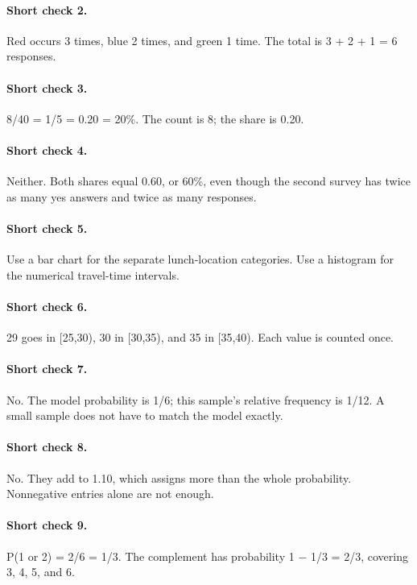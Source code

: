 \documentclass[12pt,letterpaper]{article}
\begin{document}
\paragraph{Short check 2.}
Red occurs 3 times, blue 2 times, and green 1 time. The total is 3 + 2 + 1 = 6 responses.


\paragraph{Short check 3.}
8/40 = 1/5 = 0.20 = 20\%. The count is 8; the share is 0.20.


\paragraph{Short check 4.}
Neither. Both shares equal 0.60, or 60\%, even though the second survey has twice as many yes answers and twice as many responses.


\paragraph{Short check 5.}
Use a bar chart for the separate lunch-location categories. Use a histogram for the numerical travel-time intervals.


\paragraph{Short check 6.}
29 goes in [25,30), 30 in [30,35), and 35 in [35,40). Each value is counted once.


\paragraph{Short check 7.}
No. The model probability is 1/6; this sample's relative frequency is 1/12. A small sample does not have to match the model exactly.


\paragraph{Short check 8.}
No. They add to 1.10, which assigns more than the whole probability. Nonnegative entries alone are not enough.


\paragraph{Short check 9.}
P(1 or 2) = 2/6 = 1/3. The complement has probability 1 $-$ 1/3 = 2/3, covering 3, 4, 5, and 6.
\end{document}
